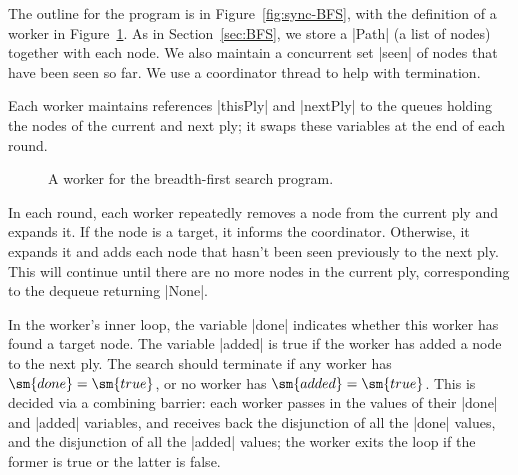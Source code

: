 
The outline for the program is in Figure~\ref{fig:sync-BFS}, with the
definition of a worker in Figure~\ref{fig:sync-BFS-worker}.  As in
Section~\ref{sec:BFS}, we store a |Path| (a list of nodes) together with each
node.  We also maintain a concurrent set |seen| of nodes that have been seen
so far.  We use a coordinator thread to help with termination. 

Each worker maintains references |thisPly| and |nextPly| to the queues holding
the nodes of the current and next ply; it swaps these variables at the end of
each round. 


\begin{figure}
\caption{A worker for the breadth-first search program.}
\label{fig:sync-BFS-worker}
\end{figure}

In each round, each worker repeatedly removes a node from the current ply and
expands it.  If the node is a target, it informs the coordinator.  Otherwise,
it expands it and adds each node that hasn't been seen previously to the next
ply.  This will continue until there are no more nodes in the current ply,
corresponding to the dequeue returning |None|.

In the worker's inner loop, the variable |done| indicates whether this worker
has found a target node.  The variable |added| is true if the worker has added
a node to the next ply.  The search should terminate if any worker has
$ = $, or no worker has $ = $.  This is
decided via a combining barrier: each worker passes in the values of their
|done| and |added| variables, and receives back the disjunction of all the
|done| values, and the disjunction of all the |added| values; the worker exits
the loop if the former is true or the latter is false.

